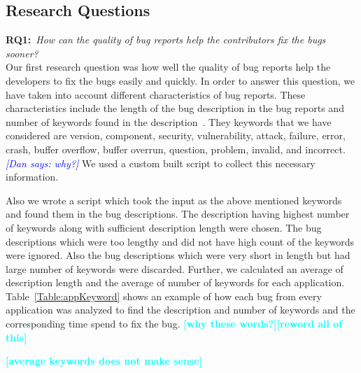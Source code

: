 \documentclass{sig-alternate}
\newcommand{\todo}[1]{\textcolor{cyan}{\textbf{[#1]}}}
\newcommand{\dan}[1]{\textcolor{blue}{{\it [Dan says: #1]}}}
\begin{document}
\subsection{Research Questions}

\noindent
\textbf{RQ1:}~\emph{How can the quality of bug reports help the contributors fix the bugs sooner?}\\

Our first research question was how well the quality of bug reports help the developers to fix the bugs easily and quickly. In order to answer this question, we have taken into account different characteristics of bug reports. These characteristics include the length of the bug description in the bug reports and number of keywords found in the description~\cite{Bhattacharya:2013:EAB:2495256.2495768}. They keywords that we have considered are version, component, security, vulnerability, attack, failure, error, crash, buffer overflow, buffer overrun, question, problem, invalid, and incorrect.\dan{why?} We used a custom built script to collect this necessary information.

Also we wrote a script which took the input as the above mentioned keywords and found them in the bug descriptions. The description having highest number of keywords along with sufficient description length were chosen. The bug descriptions which were too lengthy and did not have high count of the keywords were ignored. Also the bug descriptions which were very short in length but had large number of keywords were discarded. Further, we calculated an average of description length and the average of number of keywords for each application. 
Table~\ref{Table:appKeyword} shows an example of how each bug from every application was analyzed to find the description and number of keywords and the corresponding time spend to fix the bug. \todo{why these words?}\todo{reword all of this}

\todo{average keywords does not make sense}
\end{document}
